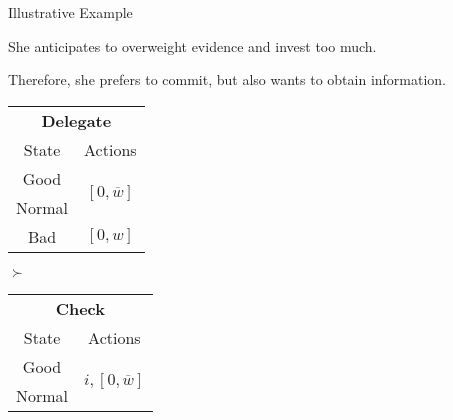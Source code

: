 \documentclass[usenames,dvipsnames,aspectratio=169,11pt, envcountsect]{beamer}
\begin{document}
\begin{frame}{Illustrative Example}

	She anticipates to overweight evidence and invest too much.

	\vfill

	Therefore, she prefers to commit, but also wants to obtain information.

	\vfill

	\begin{table}[H]
		\centering
		\begin{minipage}{0.29\textwidth}
			\centering
			\begin{tabular}{c | c}
				\multicolumn{2}{c}{\textbf{Delegate}}                                                                     \\
				State                        & Actions                                                                    \\
				\hline
				{\color{bleudefrance}Good}   & \multirow{2}{*}{{\color{bleudefrance}\( \left[0, \overline{w} \right] \)}} \\
				{\color{bleudefrance}Normal} &                                                                            \\
				Bad                          & \( \left[0, w \right]\)                                                    \\
			\end{tabular}
			\vspace{0.5cm} %
		\end{minipage}\hspace{0.3cm} %
		\( \succ \) %
		\begin{minipage}{0.29\textwidth}
			\centering
			\begin{tabular}{c | c}
				\multicolumn{2}{c}{\textbf{Check}}                                                                            \\
				State                        & Actions                                                                        \\
				\hline
				{\color{bleudefrance}Good}   & \multirow{2}{*}{{\color{bleudefrance}\( i, \left[ 0, \overline{w} \right] \)}} \\
				{\color{bleudefrance}Normal} &                                                                                \\

\end{tabular}
\end{minipage}
\end{table}
\end{frame}
\end{document}
